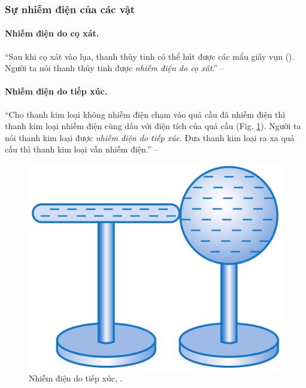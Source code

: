 \documentclass[oneside]{book}
\numberwithin{equation}{section}
\begin{document}
\subsubsection{Sự nhiễm điện của các vật}

\paragraph{Nhiễm điện do cọ xát.} ``Sau khi cọ xát vào lụa, thanh thủy tinh có thể hút được các mẩu giấy vụn (\cite[Hình 1.2: \textsf{Thanh thủy tin nhiễm điện hút các mẩu giấy}, p. 6]{SGK_Vat_Ly_11_nang_cao}). Người ta nói thanh thủy tinh được \textit{nhiễm điện do cọ xát}.'' -- \cite[p. 6]{SGK_Vat_Ly_11_nang_cao}

\paragraph{Nhiễm điện do tiếp xúc.} ``Cho thanh kim loại không nhiễm điện chạm vào quả cầu đã nhiễm điện thì thanh kim loại nhiễm điện cùng dấu với điện tích của quả cầu (Fig. \ref{fig:nhiem dien do tiep xuc}). Người ta nói thanh kim loại được \textit{nhiễm điện do tiếp xúc}. Đưa thanh kim loại ra xa quả cầu thì thanh kim loại vẫn nhiễm điện.'' -- \cite[p. 7]{SGK_Vat_Ly_11_nang_cao}

\begin{figure}[H]
	\centering
	\includegraphics[scale=0.15]{nhiem_dien_do_tiep_xuc}
	\caption{Nhiễm điện do tiếp xúc, \cite[Hình 1.3, p. 7]{SGK_Vat_Ly_11_nang_cao}.}
	\label{fig:nhiem dien do tiep xuc}
\end{figure}
\end{document}
